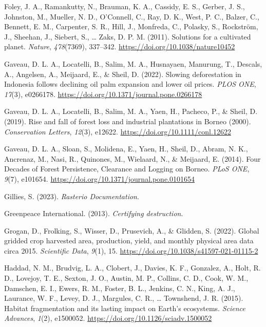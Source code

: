 \documentclass[
  letterpaper,
  DIV=11,
  numbers=noendperiod]{scrreprt}
\newlength{\cslhangindent}
\newlength{\cslentryspacingunit} %
\newenvironment{CSLReferences}[2] %
 {%
  \setlength{\parindent}{0pt}
  \ifodd #1
  \let\oldpar\par
  \def\par{\hangindent=\cslhangindent\oldpar}
  \fi
  \setlength{\parskip}{#2\cslentryspacingunit}
 }%
 {}
\begin{document}
\begin{CSLReferences}{1}{0}
\leavevmode{}%
Foley, J. A., Ramankutty, N., Brauman, K. A., Cassidy, E. S., Gerber, J.
S., Johnston, M., Mueller, N. D., O'Connell, C., Ray, D. K., West, P.
C., Balzer, C., Bennett, E. M., Carpenter, S. R., Hill, J., Monfreda,
C., Polasky, S., Rockström, J., Sheehan, J., Siebert, S., \ldots{} Zaks,
D. P. M. (2011). Solutions for a cultivated planet. \emph{Nature},
\emph{478}(7369), 337--342. \url{https://doi.org/10.1038/nature10452}

\leavevmode{}%
Gaveau, D. L. A., Locatelli, B., Salim, M. A., Husnayaen, Manurung, T.,
Descals, A., Angelsen, A., Meijaard, E., \& Sheil, D. (2022). Slowing
deforestation in {Indonesia} follows declining oil palm expansion and
lower oil prices. \emph{PLOS ONE}, \emph{17}(3), e0266178.
\url{https://doi.org/10.1371/journal.pone.0266178}

\leavevmode{}%
Gaveau, D. L. A., Locatelli, B., Salim, M. A., Yaen, H., Pacheco, P., \&
Sheil, D. (2019). Rise and fall of forest loss and industrial
plantations in {Borneo} (2000). \emph{Conservation
Letters}, \emph{12}(3), e12622. \url{https://doi.org/10.1111/conl.12622}

\leavevmode{}%
Gaveau, D. L. A., Sloan, S., Molidena, E., Yaen, H., Sheil, D., Abram,
N. K., Ancrenaz, M., Nasi, R., Quinones, M., Wielaard, N., \& Meijaard,
E. (2014). Four {Decades} of {Forest Persistence}, {Clearance} and
{Logging} on {Borneo}. \emph{PLoS ONE}, \emph{9}(7), e101654.
\url{https://doi.org/10.1371/journal.pone.0101654}

\leavevmode{}%
Gillies, S. (2023). \emph{Rasterio {Documentation}}.

\leavevmode{}%
Greenpeace International. (2013). \emph{Certifying destruction}.

\leavevmode{}%
Grogan, D., Frolking, S., Wisser, D., Prusevich, A., \& Glidden, S.
(2022). Global gridded crop harvested area, production, yield, and
monthly physical area data circa 2015. \emph{Scientific Data},
\emph{9}(1), 15. \url{https://doi.org/10.1038/s41597-021-01115-2}

\leavevmode{}%
Haddad, N. M., Brudvig, L. A., Clobert, J., Davies, K. F., Gonzalez, A.,
Holt, R. D., Lovejoy, T. E., Sexton, J. O., Austin, M. P., Collins, C.
D., Cook, W. M., Damschen, E. I., Ewers, R. M., Foster, B. L., Jenkins,
C. N., King, A. J., Laurance, W. F., Levey, D. J., Margules, C. R.,
\ldots{} Townshend, J. R. (2015). Habitat fragmentation and its lasting
impact on {Earth}'s ecosystems. \emph{Science Advances}, \emph{1}(2),
e1500052. \url{https://doi.org/10.1126/sciadv.1500052}


\end{CSLReferences}
\end{document}
